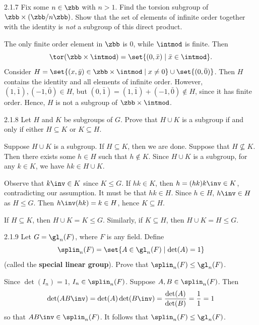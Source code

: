 \begin{exercise}{2.1.7}
    Fix some $n \in \zbb$ with $n>1$.
	Find the torsion subgroup of $\zbb \times (\zbb/n\zbb)$.
	Show that the set of elements of infinite order together with the identity is \emph{not} a subgroup of this direct product.
\end{exercise}

\begin{sol}
    The only finite order element in $\zbb$ is 0, while $\intmod$ is finite.
	Then
    \[
    	\tor(\zbb \times \intmod) = \set{(0, \bar x) \mid \bar x \in \intmod}.
    \]
    Consider $H = \set{(x, \bar y) \in \zbb \times \intmod \mid x \neq 0} \cup \set{(0, \bar 0)}$.
	Then $H$ contains the identity and all elements of infinite order.
	However, $(1, \bar 1), (-1, \bar 0) \in H$, but $(0, \bar 1) = (1, \bar 1) + (-1, \bar 0) \notin H$, since it has finite order.
	Hence, $H$ is not a subgroup of $\zbb \times \intmod$.
\end{sol}

\begin{exercise}{2.1.8}
    Let $H$ and $K$ be subgroups of $G$.
	Prove that $H \cup K$ is a subgroup if and only if either $H \subseteq K$ or $K \subseteq H$.
\end{exercise}

\begin{soliff}
    \rightimp Suppose $H \cup K$ is a subgroup.
	If $H \subseteq K$, then we are done.
	Suppose that $H \nsubseteq K$.
	Then there exists some $h \in H$ such that $h \notin K$.
	Since $H \cup K$ is a subgroup, for any $k \in K$, we have $hk \in H \cup K$.
    
    Observe that $k\inv \in K$ since $K \leq G$.
	If $hk \in K$, then $h = (hk)k\inv \in K$, contradicting our assumption.
	It must be that $hk \in H$.
	Since $h \in H$, $h\inv \in H$ as $H \leq G$.
	Then $h\inv(hk) = k \in H$, hence $K \subseteq H$.

    \leftimp If $H \subseteq K$, then $H \cup K = K \leq G$.
	Similarly, if $K \subseteq H$, then $H \cup K = H \leq G$.
\end{soliff}

\begin{spex}{2.1.9}
    Let $G = \gl_n(F)$, where $F$ is any field.
	Define
    \[
    	\splin_n(F) = \set{ A \in \gl_n(F) \mid \det(A) = 1 }
    \]
    (called the \textbf{special linear group}).
	Prove that $\splin_n(F) \le \gl_n(F)$.
\end{spex}

\begin{sol}[spsol]
    Since $\det(I_n) = 1$, $I_n \in \splin_n(F)$.
	Suppose $A, B \in \splin_n(F)$.
	Then
    \[
    	\det(AB\inv) = \det(A)\det(B\inv) = \frac{\det(A)}{\det(B)} = \frac 11 = 1
    \]
    so that $AB\inv \in \splin_n(F)$.
	It follows that $\splin_n(F) \leq \gl_n(F)$.
\end{sol}

